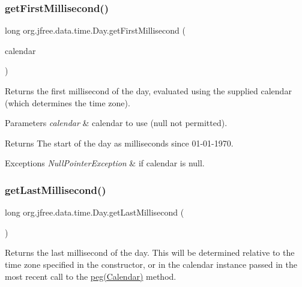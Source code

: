 \subsubsection{\texorpdfstring{get\+First\+Millisecond()}{getFirstMillisecond()}\hspace{0.1cm}{\footnotesize\ttfamily [2/2]}}
{\footnotesize\ttfamily long org.\+jfree.\+data.\+time.\+Day.\+get\+First\+Millisecond (\begin{DoxyParamCaption}\item[{Calendar}]{calendar }\end{DoxyParamCaption})}

Returns the first millisecond of the day, evaluated using the supplied calendar (which determines the time zone).


\begin{DoxyParams}{Parameters}
{\em calendar} & calendar to use ({\ttfamily null} not permitted).\\
\hline
\end{DoxyParams}
\begin{DoxyReturn}{Returns}
The start of the day as milliseconds since 01-\/01-\/1970.
\end{DoxyReturn}

\begin{DoxyExceptions}{Exceptions}
{\em Null\+Pointer\+Exception} & if {\ttfamily calendar} is {\ttfamily null}. \\
\hline
\end{DoxyExceptions}
\mbox{\label{classorg_1_1jfree_1_1data_1_1time_1_1_day_ac4c355e60db625a16590787e50c96800}} 
\subsubsection{\texorpdfstring{get\+Last\+Millisecond()}{getLastMillisecond()}\hspace{0.1cm}{\footnotesize\ttfamily [1/2]}}
{\footnotesize\ttfamily long org.\+jfree.\+data.\+time.\+Day.\+get\+Last\+Millisecond (\begin{DoxyParamCaption}{ }\end{DoxyParamCaption})}

Returns the last millisecond of the day. This will be determined relative to the time zone specified in the constructor, or in the calendar instance passed in the most recent call to the \mbox{\hyperlink{classorg_1_1jfree_1_1data_1_1time_1_1_day_aec3e06803aa5e7984df40e3d90ae67d5}{peg(\+Calendar)}} method.

